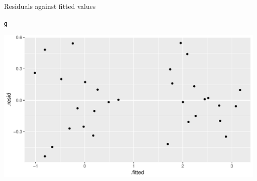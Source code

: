 \documentclass[unknownkeysallowed]{beamer}\usepackage[]{graphicx}\usepackage[]{color}
\makeatletter
\def\maxwidth{ %
  \ifdim\Gin@nat@width>\linewidth
    \linewidth
  \else
    \Gin@nat@width
  \fi
}
\newcommand{\hlstd}[1]{\textcolor[rgb]{0.345,0.345,0.345}{#1}}%
\newenvironment{kframe}{%
 \def\at@end@of@kframe{}%
 \ifinner\ifhmode%
  \def\at@end@of@kframe{\end{minipage}}%
  \begin{minipage}{\columnwidth}%
 \fi\fi%
 \def\FrameCommand##1{\hskip\@totalleftmargin \hskip-\fboxsep
 \colorbox{shadecolor}{##1}\hskip-\fboxsep
     \hskip-\linewidth \hskip-\@totalleftmargin \hskip\columnwidth}%
 \MakeFramed {\advance\hsize-\width
   \@totalleftmargin\z@ \linewidth\hsize
   \@setminipage}}%
 {\par\unskip\endMakeFramed%
 \at@end@of@kframe}
\newenvironment{knitrout}{}{} %
\makeatother
\begin{document}
\begin{frame}[fragile]{Residuals against fitted values}
  
\begin{knitrout}
\color{fgcolor}\begin{kframe}
\begin{alltt}
\hlstd{g}
\end{alltt}
\end{kframe}
\includegraphics[width=\maxwidth]{figure/unnamed-chunk-309-1} 

\end{knitrout}
  
\end{frame}
\end{document}
